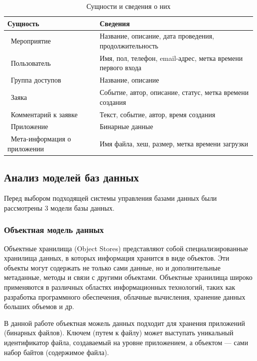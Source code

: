 \begin{table}[ht!]
	\centering
	\caption{Сущности и сведения о них}
	\label{decisions}
	\begin{tabular}{|p{4.3cm}|p{10.3cm}|}
		\hline
		\textbf{Сущность} & \textbf{Сведения}\\
		\hline 
		\ Мероприятие & Название, описание, дата проведения, продолжительность \\
		\hline 
		\ Пользователь &  Имя, пол, телефон, email-адрес, метка времени первого входа \\
		\hline 
		\ Группа доступов & Название, описание \\
		\hline 
		\ Заяка & Событие, автор, описание, статус, метка времени создания\\
		\hline 
		\ Комментарий к заявке & Текст, событие, автор, время создания \\
		\hline 
		\ Приложение & Бинарные данные \\
		\hline 
		\ Мета-информация о приложении & Имя файла, хеш, размер, метка времени загрузки \\
		\hline
	\end{tabular}
\end{table}

\subsection{Анализ моделей баз данных}

Перед выбором подходящей системы управления базами данных были рассмотрены 3 модели базы данных.

\subsubsection{Объектная модель данных}

Объектные хранилища (Object Stores) представляют собой специализированные хранилища данных, в которых информация хранится в виде объектов. Эти объекты могут содержать не только сами данные, но и дополнительные метаданные, методы и связи с другими объектами. Объектные хранилища широко применяются в различных областях информационных технологий, таких как разработка программного обеспечения, облачные вычисления, хранение данных больших объемов и др.


В данной работе объектная можель данных подходит для хранения приложений (бинарных файлов).  Ключем (путем к файлу) может выступать уникальный идентификатор файла, создаваемый на уровне приложением, а объектом --- сами набор байтов (содержимое файла).

